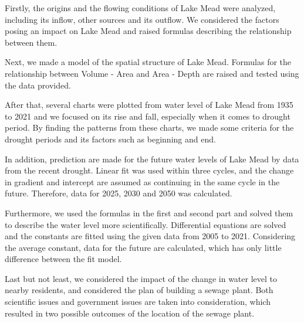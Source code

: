 \documentclass[12pt]{article}
\theoremstyle{definition}
\theoremstyle{remark}
\numberwithin{equation}{section}
\begin{document}
Firstly, the origins and the flowing conditions of Lake Mead were analyzed, including its inflow, other sources and its outflow. We considered the factors posing an impact on Lake Mead and raised formulas describing the relationship between them.

Next, we made a model of the spatial structure of Lake Mead. Formulas for the relationship between Volume - Area and Area - Depth are raised and tested using the data provided.

After that, several charts were plotted from water level of Lake Mead from 1935 to 2021 and we focused on its rise and fall, especially when it comes to drought period. By finding the patterns from these charts, we made some criteria for the drought periods and its factors such as beginning and end.

In addition, prediction are made for the future water levels of Lake Mead by data from the recent drought. Linear fit was used within three cycles, and the change in gradient and intercept are assumed as continuing in the same cycle in the future. Therefore, data for 2025, 2030 and 2050 was calculated.

Furthermore, we used the formulas in the first and second part and solved them to describe the water level more scientifically. Differential equations are solved and the constants are fitted using the given data from 2005 to 2021. Considering the average constant, data for the future are calculated, which has only little difference between the fit model.

Last but not least, we considered the impact of the change in water level to nearby residents, and considered the plan of building a sewage plant. Both scientific issues and government issues are taken into consideration, which resulted in two possible outcomes of the location of the sewage plant.

\thispagestyle{empty}
\maketitle
\thispagestyle{empty}
\newpage
\clearpage
\thispagestyle{empty}
\tableofcontents %
\newpage
\pagestyle{fancy}
\setcounter{page}{1}

\newpage
\end{document}
